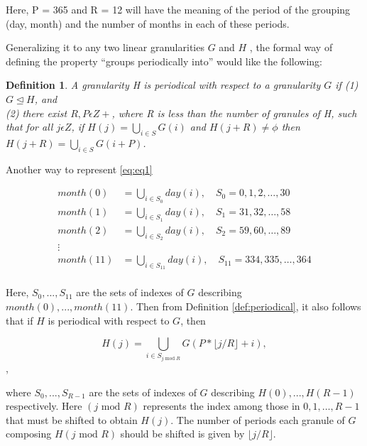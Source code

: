 \documentclass[10pt,a4paper,]{article}
\begin{document}
Here, P = 365 and R = 12 will have the meaning of the period of the grouping (day, month) and the number of months in each of these periods.

Generalizing it to any two linear granularities \(G\) and \(H\) , the formal way of defining the property \enquote{groups periodically into} would like the following:

\newtheorem{definition}{Definition}
\begin{definition}\label{def:periodical}
A granularity H is periodical with respect to a granularity $G$ if
(1) $G \trianglelefteq H$, and \\
(2) there exist $R,P \epsilon Z+$, where R is less than the number of granules of H, such
that for all $j \epsilon Z$, if $H(j) = \bigcup_{i \in S}G(i)$ and $H (j + R) \neq \phi$ then
$H (j + R) = \bigcup_{i \in S} G(i + P)$.
\end{definition}

Another way to represent \autoref{eq:eq1}

\begin{equation}\label{eq:eq3}
\begin{split}
month(0) & = \bigcup_{i \in S_0}day(i), \quad S_0 = {0, 1, 2, \dots, 30}\\
month(1) & = \bigcup_{i \in S_1}day(i), \quad S_1 = {31, 32, \dots, 58}\\
month(2) & = \bigcup_{i \in S_2}day(i), \quad S_2 = {59, 60, \dots, 89}\\
\vdots\\
month(11) &  = \bigcup_{i \in S_{11}}day(i), \quad S_{11} = {334, 335, \dots, 364}\\
\end{split}
\end{equation}

Here, \({S_0,...,S_{11}}\) are the sets of indexes of \(G\) describing \(month(0), . . . , month(11)\). Then from Definition \autoref{def:periodical}, it also follows that if \(H\) is periodical with respect to \(G\), then

\begin{equation}\label{eq:eq4}
H(j) = \bigcup_{i \in S_{j \text{~mod~}R}}G(P*\lfloor j/R \rfloor + i), 
\end{equation},

where \({S_0,...,S_{R-1}}\) are the sets of indexes of \(G\) describing \(H (0), . . . , H (R - 1)\) respectively. Here \((j \text{~mod~}R)\) represents the index among those in \({0, 1, \dots, R-1}\) that must be shifted to obtain \(H(j)\). The number of periods each granule of \(G\) composing \(H(j \text{~mod~}R)\) should be shifted is given by \(\lfloor j/R\rfloor\).
\end{document}
